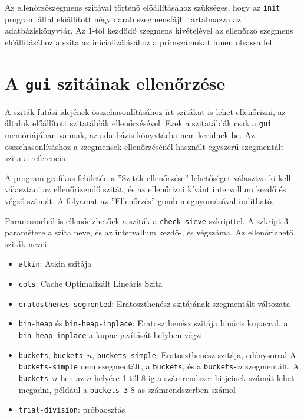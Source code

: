Az ellenőrzőszegmens szitával történő előállításához szükséges, hogy az \texttt{init} program által előállított négy darab szegmensfájlt tartalmazza az adatbáziskönyvtár.
Az $1$-től kezdődő szegmens kivételével az ellenőrző szegmens előállításához a szita az inicializálásához a prímszámokat innen olvassa fel.

\section{A \texttt{gui} szitáinak ellenőrzése}
\label{sec:szitak-ellenorzese}

A sziták futási idejének összehasonlításához írt szitákat is lehet ellenőrizni, az általuk előállított szitatáblák ellenőrzésével.
Ezek a szitatáblák csak a \texttt{gui} memóriájában vannak, az adatbázis könyvtárba nem kerülnek be.
Az összehasonlításhoz a szegmensek ellenőrzésénél használt egyszerű szegmentált szita a referencia.

A program grafikus felületén a ''Sziták ellenőrzése'' lehetőséget választva ki kell választani az ellenőrizendő szitát, és az ellenőrizni kívánt intervallum kezdő és végző számát.
A folyamat az ''Ellenőrzés'' gomb megnyomásával indítható.

Parancssorból is ellenőrizhetőek a sziták a \texttt{check-sieve} szkripttel.
A szkript 3 paramétere a szita neve, és az intervallum kezdő-, és végszáma.
Az ellenőrizhető sziták nevei:
\begin{itemize}
\item \texttt{atkin}: Atkin szitája\cite{atkin}
\item \texttt{cols}: Cache Optimalizált Lineáris Szita\cite{cols}
\item \texttt{eratosthenes-segmented}: Eratoszthenész szitájának szegmentált változata
\item \texttt{bin-heap} és \texttt{bin-heap-inplace}: Eratoszthenész szitája bináris kupaccal,
	a \texttt{bin-heap-inplace} a kupac javítását helyben végzi
\item \texttt{buckets}, \texttt{buckets-}$n$, \texttt{buckets-simple}: Eratoszthenész szitája, edénysorral
	A \texttt{buckets-simple} nem szegmentált, a \texttt{buckets}, és a \texttt{buckets-}$n$ szegmentált.
	A \texttt{buckets-}$n$-ben az $n$ helyére 1-től 8-ig a számrendszer bitjeinek számát lehet megadni,
	például a \texttt{buckets-3} 8-as számrendszerben számol
\item \texttt{trial-division}: próbaosztás
\end{itemize}

